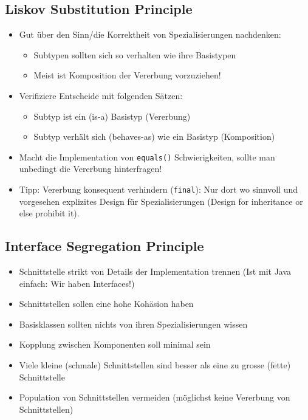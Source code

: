 \subsection{Liskov Substitution Principle}

\begin{itemize}
	\item Gut über den Sinn/die Korrektheit von Spezialisierungen nachdenken:
	\begin{itemize}
		\item Subtypen sollten sich so verhalten wie ihre Basistypen
		\item Meist ist Komposition der Vererbung vorzuziehen!
	\end{itemize}
	\item Verifiziere Entscheide mit folgenden Sätzen:
	 \begin{itemize}
		\item Subtyp ist ein (is-a) Basistyp (Vererbung)
		\item Subtyp verhält sich (behaves-as) wie ein Basistyp (Komposition)
	 \end{itemize}
	\item Macht die Implementation von \texttt{equals()} Schwierigkeiten, sollte man unbedingt die Vererbung hinterfragen!
	\item Tipp: Vererbung konsequent verhindern (\texttt{final}): Nur dort wo sinnvoll und vorgesehen explizites Design für Spezialisierungen (Design for inheritance or else prohibit it).
\end{itemize}

\subsection{Interface Segregation Principle}

\begin{itemize}
	\item Schnittstelle strikt von Details der Implementation trennen (Ist mit Java einfach: Wir haben Interfaces!)
	\item Schnittstellen sollen eine hohe Kohäsion haben
	\item Basisklassen sollten nichts von ihren Spezialisierungen wissen
	\item Kopplung zwischen Komponenten soll minimal sein
	\item Viele kleine (schmale) Schnittstellen sind besser als eine zu grosse (fette) Schnittstelle
	\item Population von Schnittstellen vermeiden (möglichst keine Vererbung von Schnittstellen)
\end{itemize}

